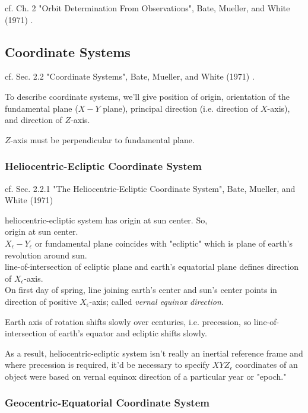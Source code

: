 \documentclass[10pt]{amsart}
\begin{document}
\begin{multicols*}{2}
cf. Ch. 2 "Orbit Determination From Observations", Bate, Mueller, and White (1971) \cite{BMW1971}.

\subsection{Coordinate Systems}

cf. Sec. 2.2 "Coordinate Systems", Bate, Mueller, and White (1971) \cite{BMW1971}.

To describe coordinate systems, we'll give position of origin, orientation of the fundamental plane ($X-Y$ plane), principal direction (i.e. direction of $X$-axis), and direction of $Z$-axis.

$Z$-axis must be perpendicular to fundamental plane.

\subsubsection{Heliocentric-Ecliptic Coordinate System}

cf. Sec. 2.2.1 "The Heliocentric-Ecliptic Coordinate System", Bate, Mueller, and White (1971) \cite{BMW1971}

heliocentric-ecliptic system has origin at sun center. So, \\
origin at sun center. \\
$X_{\epsilon} - Y_{\epsilon}$ or fundamental plane coincides with "ecliptic" which is plane of earth's revolution around sun. \\
line-of-intersection of ecliptic plane and earth's equatorial plane defines direction of $X_{\epsilon}$-axis. \\

On first day of spring, line joining earth's center and sun's center points in direction of positive $X_{\epsilon}$-axis; called \emph{vernal equinox direction}.

Earth axis of rotation shifts slowly over centuries, i.e. precession, so line-of-intersection of earth's equator and ecliptic shifts slowly.

As a result, heliocentric-ecliptic system isn't really an inertial reference frame and where precession is required, it'd be necessary to specify $XYZ_{\epsilon}$ coordinates of an object were based on vernal equinox direction of a particular year or "epoch."

\subsubsection{Geocentric-Equatorial Coordinate System}


\end{multicols*}
\end{document}
